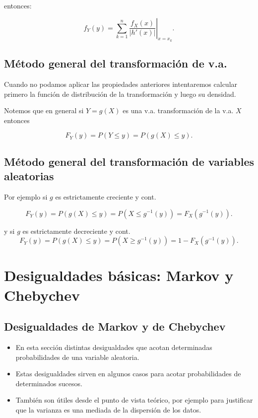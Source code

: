 \documentclass[]{book}
\providecommand{\tightlist}{%
  \setlength{\itemsep}{0pt}\setlength{\parskip}{0pt}}
\begin{document}
entonces:

\[
\displaystyle f_{Y}(y)=\left.\sum_{k=1}^{n} \frac{f_{X}(x)}
{\left|h'(x)\right|}\right|_{x=x_{k}}.
\]

\hypertarget{muxe9todo-general-del-transformaciuxf3n-de-v.a.}{%
\subsection{Método general del transformación de v.a.}\label{muxe9todo-general-del-transformaciuxf3n-de-v.a.}}

Cuando no podamos aplicar las propiedades anteriores intentaremos
calcular primero la función de distribución de la transformación
y luego su densidad.

Notemos que en general si \(Y=g(X)\) es una v.a. transformación de la
v.a. \(X\) entonces

\[
F_{Y}(y)=P(Y\leq y)=P(g(X)\leq y).
\]

\hypertarget{muxe9todo-general-del-transformaciuxf3n-de-variables-aleatorias}{%
\subsection{Método general del transformación de variables aleatorias}\label{muxe9todo-general-del-transformaciuxf3n-de-variables-aleatorias}}

Por ejemplo si \(g\) es estrictamente creciente y cont.

\[
F_{Y}(y)=P(g(X)\leq y)=P(X\leq g^{-1}(y))=F_{X}(g^{-1}(y)).
\]

y si \(g\) es estrictamente decreciente y cont.
\[
F_{Y}(y)=P(g(X)\leq y)=P(X\geq g^{-1}(y))=1-F_{X}(g^{-1}(y)).
\]

\hypertarget{desigualdades-buxe1sicas-markov-y-chebychev}{%
\section{Desigualdades básicas: Markov y Chebychev}\label{desigualdades-buxe1sicas-markov-y-chebychev}}

\hypertarget{desigualdades-de-markov-y-de-chebychev}{%
\subsection{Desigualdades de Markov y de Chebychev}\label{desigualdades-de-markov-y-de-chebychev}}

\begin{itemize}
\tightlist
\item
  En esta sección distintas desigualdades que acotan determinadas probabilidades de
  una variable aleatoria.
\item
  Estas desigualdades sirven en algunos casos para acotar probabilidades de determinados sucesos.
\item
  También son útiles desde el punto de vista teórico, por ejemplo para justificar que la varianza es una mediada de la dispersión de
  los datos.
\end{itemize}
\end{document}
